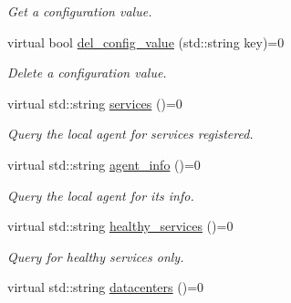 \begin{DoxyCompactItemize}
\begin{DoxyCompactList}\small\item\em Get a configuration value. \end{DoxyCompactList}\item 
virtual bool \hyperlink{classConsulInterface_a3a6e57ac45cf284e92def6136b0e23d9}{del\+\_\+config\+\_\+value} (std\+::string key)=0\hypertarget{classConsulInterface_a3a6e57ac45cf284e92def6136b0e23d9}{}\label{classConsulInterface_a3a6e57ac45cf284e92def6136b0e23d9}

\begin{DoxyCompactList}\small\item\em Delete a configuration value. \end{DoxyCompactList}\item 
virtual std\+::string \hyperlink{classConsulInterface_ad130a602282f9854a2eae856bb60a745}{services} ()=0\hypertarget{classConsulInterface_ad130a602282f9854a2eae856bb60a745}{}\label{classConsulInterface_ad130a602282f9854a2eae856bb60a745}

\begin{DoxyCompactList}\small\item\em Query the local agent for services registered. \end{DoxyCompactList}\item 
virtual std\+::string \hyperlink{classConsulInterface_a6fb0bda867b267614b44328fd044859e}{agent\+\_\+info} ()=0\hypertarget{classConsulInterface_a6fb0bda867b267614b44328fd044859e}{}\label{classConsulInterface_a6fb0bda867b267614b44328fd044859e}

\begin{DoxyCompactList}\small\item\em Query the local agent for it\textquotesingle{}s info. \end{DoxyCompactList}\item 
virtual std\+::string \hyperlink{classConsulInterface_a229eaac89811b9e1f5f3c9ec70ea68aa}{healthy\+\_\+services} ()=0\hypertarget{classConsulInterface_a229eaac89811b9e1f5f3c9ec70ea68aa}{}\label{classConsulInterface_a229eaac89811b9e1f5f3c9ec70ea68aa}

\begin{DoxyCompactList}\small\item\em Query for healthy services only. \end{DoxyCompactList}\item 
virtual std\+::string \hyperlink{classConsulInterface_a16848fcc856afae488c55e4f4febf268}{datacenters} ()=0\hypertarget{classConsulInterface_a16848fcc856afae488c55e4f4febf268}{}\label{classConsulInterface_a16848fcc856afae488c55e4f4febf268}


\end{DoxyCompactItemize}
